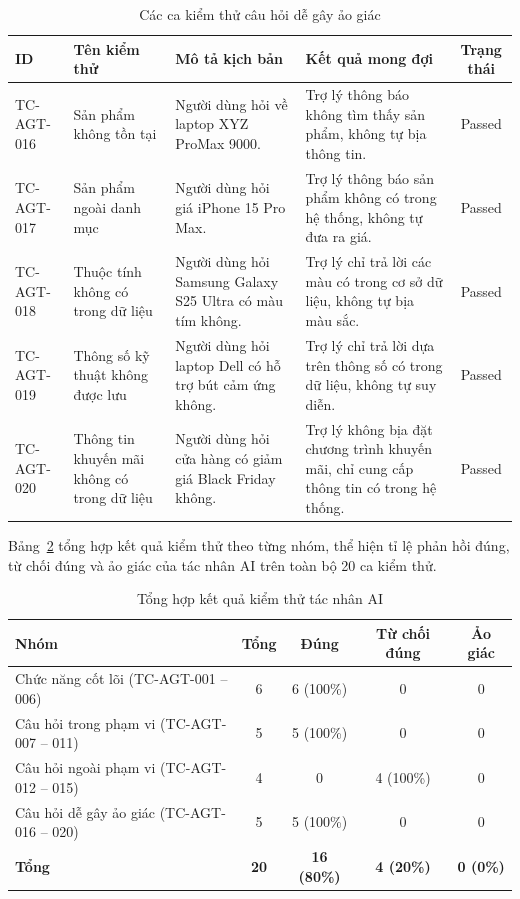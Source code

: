 \begin{table}[H]
\centering
\caption{Các ca kiểm thử câu hỏi dễ gây ảo giác}
\label{tab:tc_agent_hallucination}
\small
\begin{tabularx}{\textwidth}{|l|X|X|X|c|}
\hline
\textbf{ID} & \textbf{Tên kiểm thử} & \textbf{Mô tả kịch bản} & \textbf{Kết quả mong đợi} & \textbf{Trạng thái} \\ \hline
TC-AGT-016 & Sản phẩm không tồn tại & Người dùng hỏi về laptop XYZ ProMax 9000. & Trợ lý thông báo không tìm thấy sản phẩm, không tự bịa thông tin. & Passed \\ \hline
TC-AGT-017 & Sản phẩm ngoài danh mục & Người dùng hỏi giá iPhone 15 Pro Max. & Trợ lý thông báo sản phẩm không có trong hệ thống, không tự đưa ra giá. & Passed \\ \hline
TC-AGT-018 & Thuộc tính không có trong dữ liệu & Người dùng hỏi Samsung Galaxy S25 Ultra có màu tím không. & Trợ lý chỉ trả lời các màu có trong cơ sở dữ liệu, không tự bịa màu sắc. & Passed \\ \hline
TC-AGT-019 & Thông số kỹ thuật không được lưu & Người dùng hỏi laptop Dell có hỗ trợ bút cảm ứng không. & Trợ lý chỉ trả lời dựa trên thông số có trong dữ liệu, không tự suy diễn. & Passed \\ \hline
TC-AGT-020 & Thông tin khuyến mãi không có trong dữ liệu & Người dùng hỏi cửa hàng có giảm giá Black Friday không. & Trợ lý không bịa đặt chương trình khuyến mãi, chỉ cung cấp thông tin có trong hệ thống. & Passed \\ \hline
\end{tabularx}
\end{table}

Bảng~\ref{tab:tc_agent_summary} tổng hợp kết quả kiểm thử theo từng nhóm, thể hiện tỉ lệ phản hồi đúng, từ chối đúng và ảo giác của tác nhân AI trên toàn bộ 20 ca kiểm thử.

\begin{table}[H]
\centering
\caption{Tổng hợp kết quả kiểm thử tác nhân AI}
\label{tab:tc_agent_summary}
\small
\begin{tabularx}{\textwidth}{|X|c|c|c|c|}
\hline
\textbf{Nhóm} & \textbf{Tổng} & \textbf{Đúng} & \textbf{Từ chối đúng} & \textbf{Ảo giác} \\ \hline
Chức năng cốt lõi (TC-AGT-001 -- 006) & 6 & 6 (100\%) & 0 & 0 \\ \hline
Câu hỏi trong phạm vi (TC-AGT-007 -- 011) & 5 & 5 (100\%) & 0 & 0 \\ \hline
Câu hỏi ngoài phạm vi (TC-AGT-012 -- 015) & 4 & 0 & 4 (100\%) & 0 \\ \hline
Câu hỏi dễ gây ảo giác (TC-AGT-016 -- 020) & 5 & 5 (100\%) & 0 & 0 \\ \hline
\textbf{Tổng} & \textbf{20} & \textbf{16 (80\%)} & \textbf{4 (20\%)} & \textbf{0 (0\%)} \\ \hline
\end{tabularx}
\end{table}

